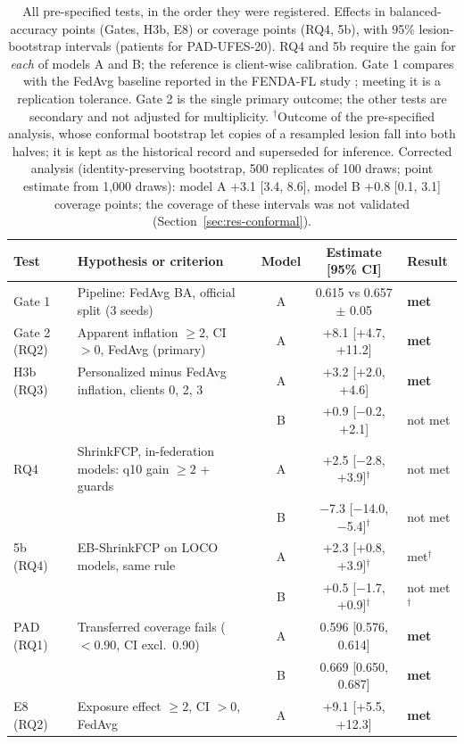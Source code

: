 \documentclass[VANCOUVER,Times1COL]{WileyNJDv5}
\begin{document}
\begin{table}[!t]
\centering
\caption{All pre-specified tests, in the order they were registered. Effects in balanced-accuracy points
(Gates, H3b, E8) or coverage points (RQ4, 5b), with 95\% lesion-bootstrap intervals (patients for
PAD-UFES-20). RQ4 and 5b require the gain for \emph{each} of models A and B; the reference is client-wise
calibration. Gate 1 compares with the FedAvg baseline reported in the FENDA-FL study
\cite{tavakoli2024fendafl}; meeting it is a replication tolerance. Gate 2 is the single primary outcome;
the other tests are secondary and not adjusted for multiplicity. $^\dagger$Outcome of the pre-specified
analysis, whose conformal bootstrap let copies of a resampled lesion fall into both halves; it is kept as the
historical record and superseded for inference. Corrected analysis (identity-preserving bootstrap, 500 replicates
of 100 draws; point estimate from 1,000 draws): model A +3.1 [3.4, 8.6], model B +0.8 [0.1, 3.1]
coverage points; the coverage of these intervals was not validated (Section~\ref{sec:res-conformal}).}
\label{tab:scorecard}
\begin{tabular}{@{}llccl@{}}
\toprule
Test & Hypothesis or criterion & Model & Estimate [95\% CI] & Result \\
\midrule
Gate 1 & Pipeline: FedAvg BA, official split (3 seeds) & A & 0.615 vs 0.657 $\pm$ 0.05 & \textbf{met} \\
Gate 2 (RQ2) & Apparent inflation $\ge 2$, CI $>0$, FedAvg (primary) & A & +8.1 [+4.7, +11.2] & \textbf{met} \\
H3b (RQ3) & Personalized minus FedAvg inflation, clients 0, 2, 3 & A & +3.2 [+2.0, +4.6] & \textbf{met} \\
 &  & B & +0.9 [$-$0.2, +2.1] & not met \\
RQ4 & ShrinkFCP, in-federation models: q10 gain $\ge 2$ + guards & A & +2.5 [$-$2.8, +3.9]$^\dagger$ & not met \\
 &  & B & $-$7.3 [$-$14.0, $-$5.4]$^\dagger$ & not met \\
5b (RQ4) & EB-ShrinkFCP on LOCO models, same rule & A & +2.3 [+0.8, +3.9]$^\dagger$ & met$^\dagger$ \\
 &  & B & +0.5 [$-$1.7, +0.9]$^\dagger$ & not met$^\dagger$ \\
PAD (RQ1) & Transferred coverage fails ($<0.90$, CI excl.\ 0.90) & A & 0.596 [0.576, 0.614] & \textbf{met} \\
 &  & B & 0.669 [0.650, 0.687] & \textbf{met} \\
E8 (RQ2) & Exposure effect $\ge 2$, CI $>0$, FedAvg & A & +9.1 [+5.5, +12.3] & \textbf{met} \\
\bottomrule
\end{tabular}
\end{table}
\end{document}
